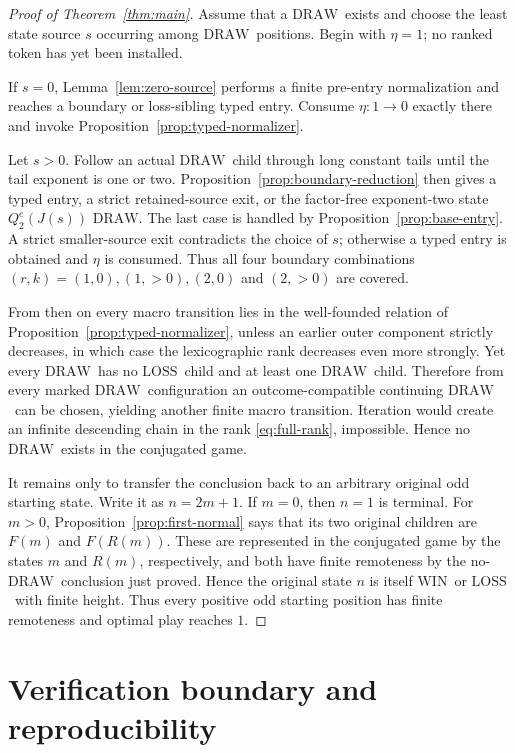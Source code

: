 \documentclass[11pt]{article}
\newcommand{\WIN}{\ensuremath{\mathrm{WIN}}}
\newcommand{\LOSS}{\ensuremath{\mathrm{LOSS}}}
\newcommand{\DRAW}{\ensuremath{\mathrm{DRAW}}}
\begin{document}
\begin{proof}[Proof of Theorem~\ref{thm:main}]
Assume that a \DRAW\ exists and choose the least state source $s$ occurring
among \DRAW\ positions. Begin with $\eta=1$; no ranked token has yet been installed.

If $s=0$, Lemma~\ref{lem:zero-source} performs a finite pre-entry
normalization and reaches a boundary or loss-sibling typed entry. Consume
$\eta:1\to0$ exactly there and invoke Proposition~\ref{prop:typed-normalizer}.

Let $s>0$. Follow an actual \DRAW\ child through long constant tails until
the tail exponent is one or two. Proposition~\ref{prop:boundary-reduction}
then gives a typed entry, a strict retained-source exit, or the factor-free
exponent-two state $Q_2^e(J(s))$ \DRAW. The last case is handled by
Proposition~\ref{prop:base-entry}. A strict smaller-source exit contradicts
the choice of $s$; otherwise a typed entry is obtained and $\eta$ is
consumed. Thus all four boundary combinations $(r,k)=(1,0),(1,>0),(2,0)$ and
$(2,>0)$ are covered.

From then on every macro transition lies in the well-founded relation of
Proposition~\ref{prop:typed-normalizer}, unless an earlier outer component
strictly decreases, in which case the lexicographic rank decreases even more
strongly. Yet every \DRAW\ has no \LOSS\ child and at least one \DRAW\ child.
Therefore from every marked \DRAW\ configuration an outcome-compatible
continuing \DRAW\ can be chosen, yielding another finite macro transition.
Iteration would create an infinite descending chain in the rank
\eqref{eq:full-rank}, impossible. Hence no \DRAW\ exists in the conjugated
game.

It remains only to transfer the conclusion back to an arbitrary original
odd starting state. Write it as $n=2m+1$. If $m=0$, then $n=1$ is terminal.
For $m>0$, Proposition~\ref{prop:first-normal} says that its two original
children are $F(m)$ and $F(R(m))$. These are represented in the conjugated game
by the states $m$ and $R(m)$, respectively, and both have finite remoteness by
the no-\DRAW\ conclusion just proved. Hence the original state $n$ is itself
\WIN\ or \LOSS\ with finite height. Thus every positive odd starting position
has finite remoteness and optimal play reaches $1$.
\end{proof}

\section{Verification boundary and reproducibility}
\end{document}
